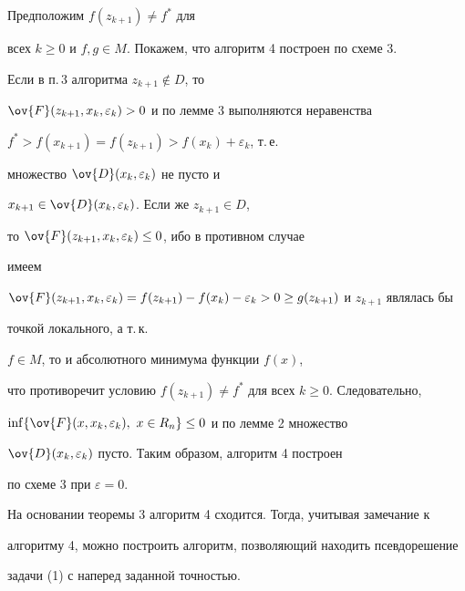 \begin{notenonum}


Предположим $f(z_{k+1})\ne f^*$ для


всех $k\ge0$ и $f,g\in M$. Покажем, что алгоритм 4 построен по схеме 3.


Если в п.\,3 алгоритма $z_{k+1}\notin D$, то 


$\ov{F}(z_{k+1},x_k,\varepsilon_k)>0$ и по лемме 3 выполняются неравенства


$f^*>f(x_{k+1})=f(z_{k+1})>f(x_k)+\varepsilon_k$, т.\,е.


множество $\ov{D}(x_k,\varepsilon_k)$ не пусто и


$x_{k+1}\in \ov{D}(x_k,\varepsilon_k)$. Если же $z_{k+1}\in D$,


то $\ov{F}(z_{k+1},x_k,\varepsilon_k)\le 0$, ибо в противном случае


имеем


$\ov{F}(z_{k+1},x_k,\varepsilon_k)=


f(z_{k+1})-f(x_k)-\varepsilon_k>0\ge g(z_{k+1})$ и $z_{k+1}$ являлась бы


точкой локального, а т.\,к.


$f\in M$, то и абсолютного минимума функции $f(x)$,


что противоречит условию $f(z_{k+1})\ne f^*$ для всех $k\ge0$. Следовательно,


$\inf\{\ov{F}(x,x_k,\varepsilon_k),\ x\in R_n\}\le 0$ и по лемме 2 множество


$\ov{D}(x_k,\varepsilon_k)$ пусто. Таким образом, алгоритм 4 построен


по схеме 3 при $\varepsilon=0$.


\end{notenonum}





На основании теоремы 3 алгоритм 4 сходится. Тогда, учитывая замечание к


алгоритму 4, можно построить алгоритм, позволяющий находить псевдорешение


задачи (1) с наперед заданной точностью.





